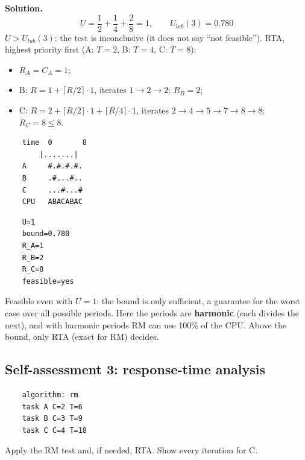 \textbf{Solution.}
\[
U = \frac{1}{2} + \frac{1}{4} + \frac{2}{8} = 1, \qquad U_{lub}(3) = 0.780
\]
$U > U_{lub}(3)$: the test is inconclusive (it does not say ``not feasible''). RTA, highest priority first (A: $T = 2$, B: $T = 4$, C: $T = 8$):
\begin{itemize}
    \item $R_A = C_A = 1$;
    \item B: $R = 1 + \lceil R/2 \rceil \cdot 1$, iterates $1 \to 2 \to 2$: $R_B = 2$;
    \item C: $R = 2 + \lceil R/2 \rceil \cdot 1 + \lceil R/4 \rceil \cdot 1$, iterates $2 \to 4 \to 5 \to 7 \to 8 \to 8$: $R_C = 8 \le 8$.
\end{itemize}
\begin{verbatim}
    time  0       8
        |.......|
    A     #.#.#.#.
    B     .#...#..
    C     ...#...#
    CPU   ABACABAC
\end{verbatim}
\begin{verbatim}
    U=1
    bound=0.780
    R_A=1
    R_B=2
    R_C=8
    feasible=yes
\end{verbatim}
Feasible even with $U = 1$: the bound is only sufficient, a guarantee for the worst case over all possible periods. Here the periods are \textbf{harmonic} (each divides the next), and with harmonic periods RM can use 100\% of the CPU. Above the bound, only RTA (exact for RM) decides.

\subsection*{Self-assessment 3: response-time analysis}
\begin{lstlisting}
    algorithm: rm
    task A C=2 T=6
    task B C=3 T=9
    task C C=4 T=18
\end{lstlisting}
Apply the RM test and, if needed, RTA. Show every iteration for C.

